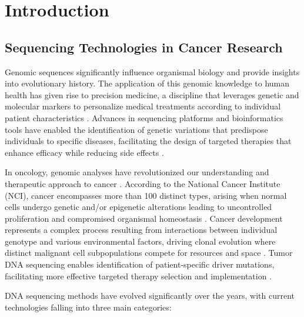 \chapter{Introduction}

\section{Sequencing Technologies in Cancer Research}

Genomic sequences significantly influence organismal biology and provide 
insights into evolutionary history. The application of this genomic knowledge 
to human health has given rise to precision medicine, a discipline that 
leverages genetic and molecular markers to personalize medical treatments 
according to individual patient characteristics \cite{collins_new_2015}. 
Advances in sequencing platforms and bioinformatics tools have enabled the 
identification of genetic variations that predispose individuals to specific 
diseases, facilitating the design of targeted therapies that enhance efficacy 
while reducing side effects \cite{carrasco-ramiro_human_2017}.

In oncology, genomic analyses have revolutionized our understanding and 
therapeutic approach to cancer \cite{johannessen_progress_2017}. According to 
the National Cancer Institute (NCI), cancer encompasses more than 100 distinct 
types, arising when normal cells undergo genetic and/or epigenetic alterations 
leading to uncontrolled proliferation and compromised organismal homeostasis
\cite{nci_what_2007}. Cancer development represents a complex process resulting 
from interactions between individual genotype and various environmental 
factors, driving clonal evolution where distinct malignant cell subpopulations 
compete for resources and space \cite{turajlic_resolving_2019}. Tumor DNA 
sequencing enables identification of patient-specific driver mutations, 
facilitating more effective targeted therapy selection and implementation 
\cite{sicklick_molecular_2019}.

DNA sequencing methods have evolved significantly over the years, with current 
technologies falling into three main categories:

